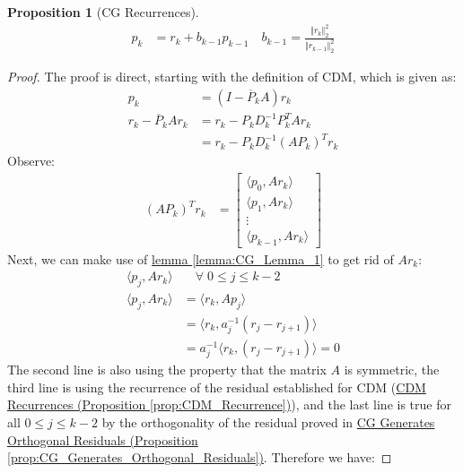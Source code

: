 \documentclass[]{article}
\theoremstyle{definition}
\newtheorem{prop}{Proposition}[section]  %
\begin{document}
            \begin{prop}[CG Recurrences]\label{prop:CG_Recurrences}
                \begin{align}
                    p_k &= r_k + b_{k - 1}p_{k - 1} \quad b_{k - 1} = \frac{\Vert r_k\Vert_2^2}
                    {\Vert r_{k - 1}\Vert_2^2}
                \end{align}
            \end{prop}
            \begin{proof}
                The proof is direct, starting with the definition of CDM, which is given as: 
                \begin{align}
                    p_k &= (I - \overline{P}_kA)r_k
                    \\
                    r_k - \overline{P}_kAr_k &= 
                    r_k - P_kD^{-1}_kP^T_kAr_k
                    \\
                    &= r_k - P_kD^{-1}_k(AP_k)^Tr_k
                \end{align}
                Observe:
                \begin{align}
                    (AP_k)^Tr_k &= 
                    \begin{bmatrix}
                        \langle p_0, Ar_k\rangle
                        \\
                        \langle p_1, Ar_k\rangle
                        \\
                        \vdots
                        \\
                        \langle p_{k - 1}, Ar_k\rangle
                    \end{bmatrix}
                \end{align}
                Next, we can make use of \hyperref[lemma:CG_Lemma_1]{lemma \ref*{lemma:CG_Lemma_1}} to get rid of $Ar_k$: 
                \begin{align}
                    \langle p_j, Ar_k\rangle& \quad \forall\; 0 \le j \le k -2 
                    \\
                    \langle p_j, Ar_k\rangle&= \langle r_k, Ap_j\rangle
                    \\
                    &= \langle r_k, a_j^{-1}(r_j - r_{j + 1})\rangle
                    \\
                    &= a_j^{-1}\langle r_k, (r_j - r_{j + 1})\rangle = 0
                \end{align}
                The second line is also using the property that the matrix $A$ is symmetric, the third line is using the recurrence of the residual established for CDM (\hyperref[prop:CDM_Recurrence]{CDM Recurrences (Proposition \ref*{prop:CDM_Recurrence})}), and the last line is true for all $0 \le j \le k - 2$ by the orthogonality of the residual proved in \hyperref[prop:CG_Generates_Orthogonal_Residuals]{CG Generates Orthogonal Residuals (Proposition \ref*{prop:CG_Generates_Orthogonal_Residuals})}. Therefore we have: 

\end{proof}
\end{document}
